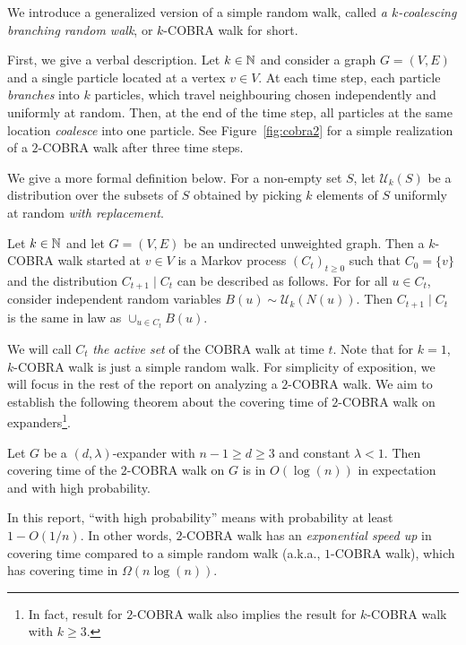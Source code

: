 \documentclass[11pt]{article}
\theoremstyle{remark}
\begin{document}
We introduce a generalized version of a simple random walk, called \emph{a $k$-coalescing branching random walk}, or $k$-COBRA walk for short.

First, we give a verbal description. Let $k\in \mathbb N$ and consider a graph $G = (V,E)$ and a single particle located at a vertex $v \in V$. At each time step, each particle \emph{branches} into $k$ particles, which travel neighbouring chosen independently and uniformly at random. Then, at the end of the time step, all particles at the same location \emph{coalesce} into one particle. See Figure~\ref{fig:cobra2} for a simple realization of a $2$-COBRA walk after three time steps. 

We give a more formal definition below. For a non-empty set $S$, let $\mathcal U_k(S)$ be a distribution over the subsets of $S$ obtained by picking $k$ elements of $S$ uniformly at random \emph{with replacement}.  


\begin{definition}
\label{def:cobra}
    Let $k\in \mathbb N$ and let $G = (V,E)$ be an undirected unweighted graph. 
    Then a $k$-COBRA walk started at $v \in V$ is a Markov process $(C_t)_{t\ge0}$ such that $C_0 = \{v\}$ and the distribution $C_{t+1} \mid C_t$ can be described as follows. For for all $u \in C_t$, consider independent random variables $B(u) \sim \mathcal U_k(N(u))$. Then $C_{t+1} \mid C_t$ is the same in law as $\cup_{u \in C_t} B(u)$.
\end{definition}

We will call $C_t$ \emph{the active set} of the COBRA walk at time $t$. Note that for $k = 1$, $k$-COBRA walk is just a simple random walk. For simplicity of exposition, we will focus in the rest of the report on analyzing a $2$-COBRA walk. We aim to establish the following theorem about the covering time of $2$-COBRA walk on expanders\footnote{In fact, result for $2$-COBRA walk also implies the result for $k$-COBRA walk with $k \ge 3$.}.
\begin{theorem}
    \label{thm:main}
    Let $G$ be a $(d,\lambda)$-expander with $n-1 \ge d \ge 3$ and constant $\lambda < 1$. Then covering time of the $2$-COBRA walk on $G$ is in $O(\log(n))$ in expectation and with high probability. 
\end{theorem}
In this report, ``with high probability'' means with probability at least $1 - O\left(1/n\right)$. In other words, $2$-COBRA walk has an \emph{exponential speed up} in covering time compared to a simple random walk (a.k.a., $1$-COBRA walk), which has covering time in $\Omega(n\log(n))$.
\end{document}

